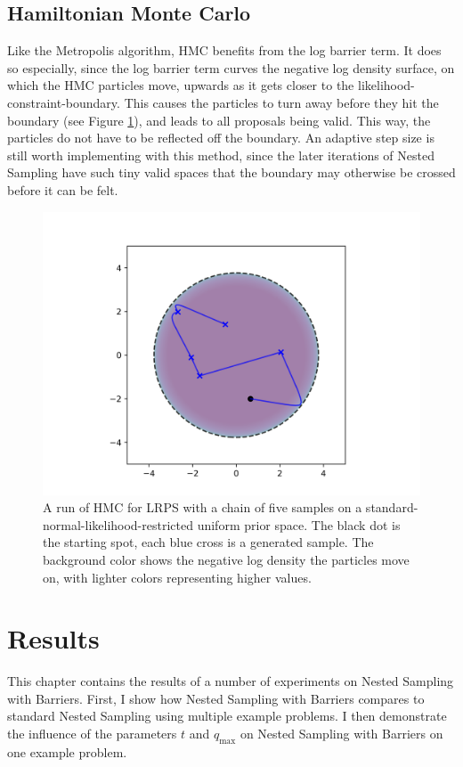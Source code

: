 \documentclass[12pt, a4paper]{report}
\begin{document}
\subsection{Hamiltonian Monte Carlo}
Like the Metropolis algorithm, HMC benefits from the log barrier term.
It does so especially, since the log barrier term curves the negative log density surface, on which the HMC particles move, upwards as it gets closer to the likelihood-constraint-boundary.
This causes the particles to turn away before they hit the boundary (see Figure \ref{fig:barrier_sampling_hmc}), and leads to all proposals being valid.
This way, the particles do not have to be reflected off the boundary.
An adaptive step size is still worth implementing with this method, since the later iterations of Nested Sampling have such tiny valid spaces that the boundary may otherwise be crossed before it can be felt.

\begin{figure}
    \centering
    \includegraphics[scale=0.8]{figs/barrier_sampling_hmc.png}
    \caption{A run of HMC for LRPS with a chain of five samples on a standard-normal-likelihood-restricted uniform prior space.
    The black dot is the starting spot, each blue cross is a generated sample.
    The background color shows the negative log density the particles move on, with lighter colors representing higher values.}
    \label{fig:barrier_sampling_hmc}
\end{figure}



\FloatBarrier
\section{Results}
This chapter contains the results of a number of experiments on Nested Sampling with Barriers.
First, I show how Nested Sampling with Barriers compares to standard Nested Sampling using multiple example problems.
I then demonstrate the influence of the parameters $t$ and $q_{\textrm{max}}$ on Nested Sampling with Barriers on one example problem.
\end{document}
